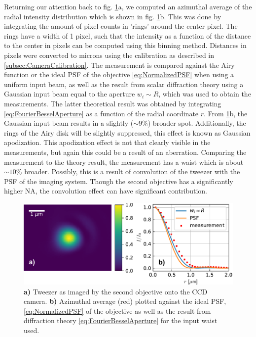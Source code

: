 Returning our attention back to fig. \ref{fig:2Dresults}a, we computed an azimuthal average of the radial intensity distribution which is shown in fig. \ref{fig:2Dresults}b.
This was done by integrating the amount of pixel counts in 'rings' around the center pixel.
The rings have a width of 1 pixel, such that the intensity as a function of the distance to the center in pixels can be computed using this binning method.
Distances in pixels were converted to microns using the calibration as described in \cref{subsec:CameraCalibration}.
The measurement is compared against the Airy function or the ideal \ac{PSF} of the objective \cref{eq:NormalizedPSF} when using a uniform input beam, as well as the result from scalar diffraction theory using a Gaussian input beam equal to the aperture $w_i \sim R$, which was used to obtain the measurements.
The latter theoretical result was obtained by integrating \cref{eq:FourierBesselAperture} as a function of the radial coordinate $r$.
From \ref{fig:2Dresults}b, the Gaussian input beam results in a slightly ($\sim 9\%$) broader spot.
Additionally, the rings of the Airy disk will be slightly suppressed, this effect is known as Gaussian apodization.
This apodization effect is not that clearly visible in the measurements, but again this could be a result of an aberration.
Comparing the measurement to the theory result, the measurement has a waist which is about $\sim 10\%$ broader. Possibly, this is a result of convolution of the tweezer with the \ac{PSF} of the imaging system. Though the second objective has a significantly higher NA, the convolution effect can have significant contribution.

\begin{figure}
    \centering
    \includegraphics[width=\linewidth]{figures/AzimuthalAverageSpotZoomed.pdf}
    \caption{\textbf{a)} Tweezer as imaged by the second objective onto the CCD camera. 
	\textbf{ b)} Azimuthal average (red) plotted against the ideal \ac{PSF}, \cref{eq:NormalizedPSF} of the objective as well as the result from diffraction theory \cref{eq:FourierBesselAperture} for the input waist used.}
    \label{fig:2Dresults}
\end{figure}

